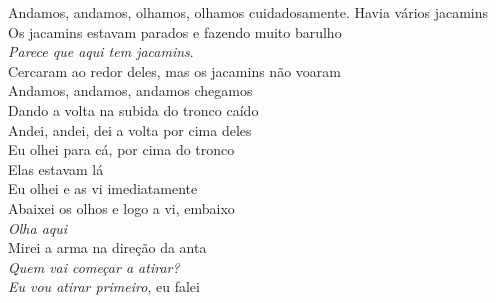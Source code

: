 \noindent   Andamos, andamos, olhamos, olhamos cuidadosamente. Havia vários jacamins\\
  Os jacamins estavam parados e fazendo muito barulho\\
  \textit{Parece que aqui tem jacamins}.\\
  Cercaram ao redor deles, mas os jacamins não voaram\\
  Andamos, andamos, andamos chegamos\\
  Dando a volta na subida do tronco caído\\
  Andei, andei, dei a volta por cima deles\\
  Eu olhei para cá, por cima do tronco\\
  Elas estavam lá\\
  Eu olhei e as vi imediatamente\\
  Abaixei os olhos e logo a vi, embaixo\\
  \textit{Olha aqui}\\
  Mirei a arma na direção da anta\\
  \textit{Quem vai começar a atirar?}\\
  \textit{Eu vou atirar primeiro}, eu falei\\

